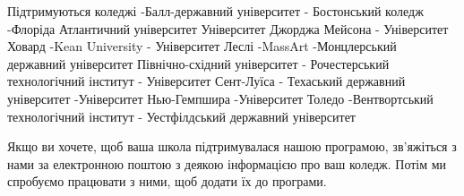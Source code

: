 Підтримуються коледжі
-Балл-державний університет
- Бостонський коледж
-Флоріда Атлантичний університет
Університет Джорджа Мейсона
- Університет Ховард
-Kean University
- Університет Леслі
-MassArt
-Монцлерський державний університет
Північно-східний університет
- Рочестерський технологічний інститут
- Університет Сент-Луїса
- Техаський державний університет
-Університет Нью-Гемпшира
-Університет Толедо
-Вентвортський технологічний інститут
- Уестфілдський державний університет

Якщо ви хочете, щоб ваша школа підтримувалася нашою програмою, зв’яжіться з нами за електронною поштою з деякою інформацією про ваш коледж. Потім ми спробуємо працювати з ними, щоб додати їх до програми.
